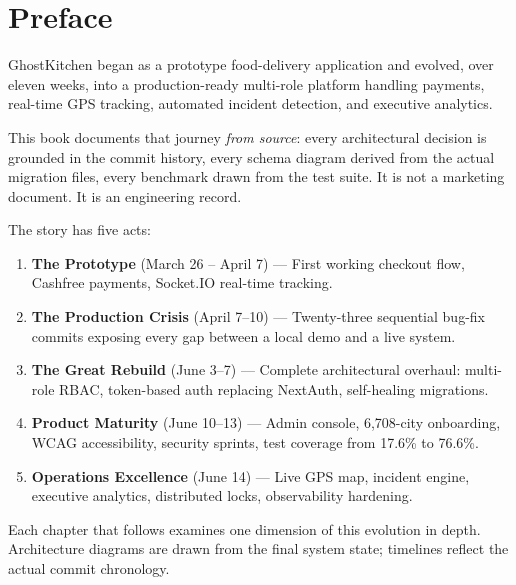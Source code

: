 \documentclass[11pt,a4paper,twoside]{book}
\begin{document}
\cleardoublepage
\tableofcontents
\cleardoublepage

\chapter*{Preface}

GhostKitchen began as a prototype food-delivery application and evolved, over
eleven weeks, into a production-ready multi-role platform handling payments,
real-time GPS tracking, automated incident detection, and executive analytics.

This book documents that journey \emph{from source}: every architectural
decision is grounded in the commit history, every schema diagram derived from
the actual migration files, every benchmark drawn from the test suite.  It is
not a marketing document.  It is an engineering record.

The story has five acts:

\begin{enumerate}[leftmargin=1.5em]
  \item \textbf{The Prototype} (March 26 – April 7) — First working checkout flow,
        Cashfree payments, Socket.IO real-time tracking.
  \item \textbf{The Production Crisis} (April 7–10) — Twenty-three sequential bug-fix
        commits exposing every gap between a local demo and a live system.
  \item \textbf{The Great Rebuild} (June 3–7) — Complete architectural overhaul:
        multi-role RBAC, token-based auth replacing NextAuth, self-healing migrations.
  \item \textbf{Product Maturity} (June 10–13) — Admin console, 6,708-city onboarding,
        WCAG accessibility, security sprints, test coverage from 17.6\% to 76.6\%.
  \item \textbf{Operations Excellence} (June 14) — Live GPS map, incident engine,
        executive analytics, distributed locks, observability hardening.
\end{enumerate}

Each chapter that follows examines one dimension of this evolution in depth.
Architecture diagrams are drawn from the final system state; timelines reflect
the actual commit chronology.

\mainmatter

\end{document}
